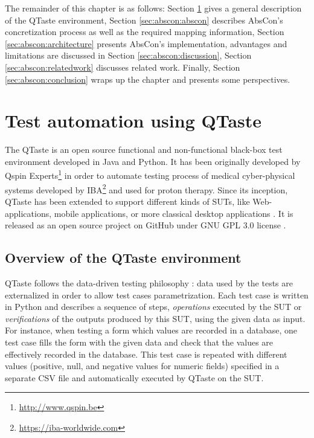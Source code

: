 The remainder of this chapter is as follows: Section \ref{sec:abscon:qtaste} gives a general description of the QTaste environment, Section \ref{sec:abscon:abscon} describes AbsCon's \gls{concretization} process as well as the required mapping information, Section \ref{sec:abscon:architecture} presents AbsCon's implementation, advantages and limitations are discussed in Section \ref{sec:abscon:discussion}, Section \ref{sec:abscon:relatedwork} discusses related work. Finally, Section \ref{sec:abscon:conclusion} wraps up the chapter and presents some perspectives.


\section{Test automation using QTaste}

\label{sec:abscon:qtaste}

The \acrfull{QTaste} \cite{qtaste} is an open source functional and non-functional black-box test environment developed in Java and Python. It has been originally developed by Qspin Experts\footnote{\url{http://www.qspin.be}} in order to automate testing process of medical cyber-physical systems developed by IBA\footnote{\url{https://iba-worldwide.com}} and used for proton therapy. 
Since its inception, QTaste has been extended to support different kinds of SUTs, like Web-applications, mobile applications, or more classical desktop applications \cite{Doucet2014}. It is released as an open source project on GitHub under GNU GPL 3.0 license \cite{qtaste}. 

\subsection{Overview of the QTaste environment}

QTaste follows the data-driven testing philosophy \cite{Williams2007}: data used by the tests are externalized in order to allow test cases parametrization. Each test case is written in Python and describes a sequence of steps, \ie \emph{operations} executed by the SUT or \emph{verifications} of the outputs produced by this SUT, using the given data as input. For instance, when testing a form which values are recorded in a database, one test case fills the form with the given data and check that the values are effectively recorded in the database. This test case is repeated with different values (\eg positive, null, and negative values for numeric fields) specified in a separate CSV file and automatically executed by QTaste on the SUT. 


